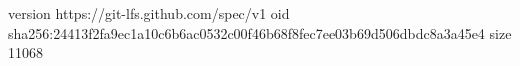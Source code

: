 version https://git-lfs.github.com/spec/v1
oid sha256:24413f2fa9ec1a10c6b6ac0532c00f46b68f8fec7ee03b69d506dbdc8a3a45e4
size 11068
